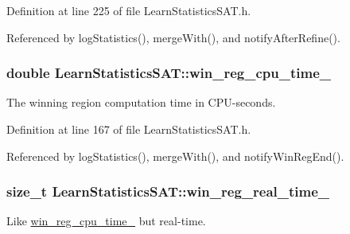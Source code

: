 Definition at line 225 of file Learn\-Statistics\-S\-A\-T.\-h.



Referenced by log\-Statistics(), merge\-With(), and notify\-After\-Refine().

\hypertarget{classLearnStatisticsSAT_af9823be5155743223790ae01b91b7ca8}{
\subsubsection[{win\-\_\-reg\-\_\-cpu\-\_\-time\-\_\-}]{\setlength{\rightskip}{0pt plus 5cm}double Learn\-Statistics\-S\-A\-T\-::win\-\_\-reg\-\_\-cpu\-\_\-time\-\_\-\hspace{0.3cm}{\ttfamily [protected]}}}\label{classLearnStatisticsSAT_af9823be5155743223790ae01b91b7ca8}


The winning region computation time in C\-P\-U-\/seconds. 



Definition at line 167 of file Learn\-Statistics\-S\-A\-T.\-h.



Referenced by log\-Statistics(), merge\-With(), and notify\-Win\-Reg\-End().

\hypertarget{classLearnStatisticsSAT_a97f7a6ccfc2d6677ae8a6c16dddd6b71}{
\subsubsection[{win\-\_\-reg\-\_\-real\-\_\-time\-\_\-}]{\setlength{\rightskip}{0pt plus 5cm}size\-\_\-t Learn\-Statistics\-S\-A\-T\-::win\-\_\-reg\-\_\-real\-\_\-time\-\_\-\hspace{0.3cm}{\ttfamily [protected]}}}\label{classLearnStatisticsSAT_a97f7a6ccfc2d6677ae8a6c16dddd6b71}


Like \hyperlink{classLearnStatisticsSAT_af9823be5155743223790ae01b91b7ca8}{win\-\_\-reg\-\_\-cpu\-\_\-time\-\_\-} but real-\/time. 



